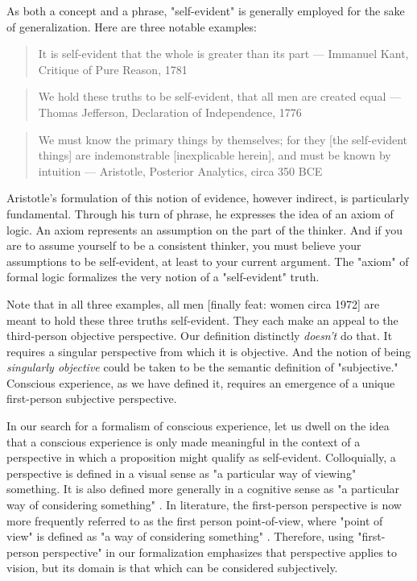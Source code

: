 \documentclass[runningheads]{llncs}
\begin{document}
As both a concept and a phrase, "self-evident" is generally employed for the sake of generalization. Here are three notable examples:

\begin{quote}
It is self-evident that the whole is greater than its part --- Immanuel Kant, Critique of Pure Reason, 1781
\end{quote}

\begin{quote}
We hold these truths to be self-evident, that all men are created equal --- Thomas Jefferson, Declaration of Independence, 1776
\end{quote}

\begin{quote}
We must know the primary things by themselves; for they [the self-evident things] are indemonstrable [inexplicable herein], and must be known by intuition --- Aristotle, Posterior Analytics, circa 350 BCE
\end{quote}

Aristotle's formulation of this notion of evidence, however indirect, is particularly fundamental. Through his turn of phrase, he expresses the idea of an axiom of logic. An axiom represents an assumption on the part of the thinker. And if you are to assume yourself to be a consistent thinker, you must believe your assumptions to be self-evident, at least to your current argument. The "axiom" of formal logic formalizes the very notion of a "self-evident" truth.

Note that in all three examples, all men [finally feat: women circa 1972] are meant to hold these three truths self-evident. They each make an appeal to the third-person objective perspective. Our definition distinctly \emph{doesn't} do that. It requires a singular perspective from which it is objective. And the notion of being \emph{singularly objective} could be taken to be the semantic definition of "subjective." Conscious experience, as we have defined it, requires an emergence of a unique first-person subjective perspective.

In our search for a formalism of conscious experience, let us dwell on the idea that a conscious experience is only made meaningful in the context of a perspective in which a proposition might qualify as self-evident. Colloquially, a perspective is defined in a visual sense as "a particular way of viewing" something. It is also defined more generally in a cognitive sense as "a particular way of considering something" \cite{DictionaryC}. In literature, the first-person perspective is now more frequently referred to as the first person point-of-view, where "point of view" is defined as "a way of considering something" \cite{DictionaryC}. Therefore, using "first-person perspective" in our formalization emphasizes that perspective applies to vision, but its domain is that which can be considered subjectively.
\end{document}
